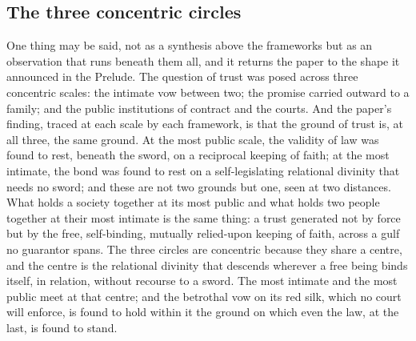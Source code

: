 \subsection*{The three concentric circles}
\label{p13:sub:concl-circles}

One thing may be said, not as a synthesis above the frameworks but as an observation that runs beneath them all, and it returns the paper to the shape it announced in the Prelude. The question of trust was posed across three concentric scales: the intimate vow between two; the promise carried outward to a family; and the public institutions of contract and the courts. And the paper's finding, traced at each scale by each framework, is that the ground of trust is, at all three, the same ground. At the most public scale, the validity of law was found to rest, beneath the sword, on a reciprocal keeping of faith; at the most intimate, the bond was found to rest on a self-legislating relational divinity that needs no sword; and these are not two grounds but one, seen at two distances. What holds a society together at its most public and what holds two people together at their most intimate is the same thing: a trust generated not by force but by the free, self-binding, mutually relied-upon keeping of faith, across a gulf no guarantor spans. The three circles are concentric because they share a centre, and the centre is the relational divinity that descends wherever a free being binds itself, in relation, without recourse to a sword. The most intimate and the most public meet at that centre; and the betrothal vow on its red silk, which no court will enforce, is found to hold within it the ground on which even the law, at the last, is found to stand.

